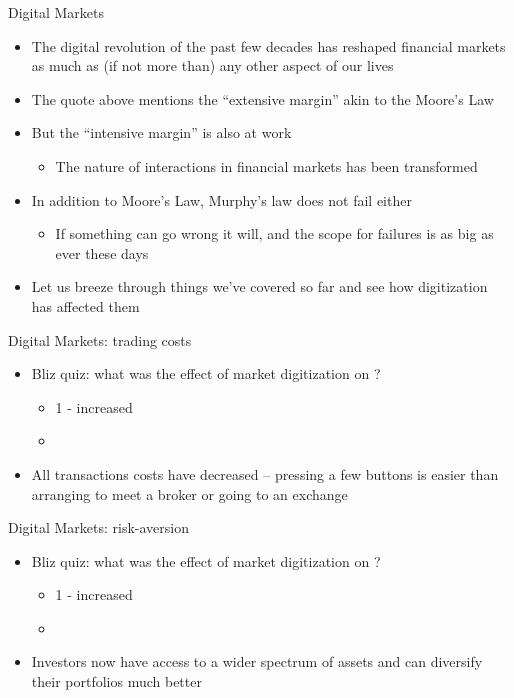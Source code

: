\documentclass[english,10pt
,aspectratio=169
]{beamer}
\begin{document}
\begin{frame}{Digital Markets}
	\begin{itemize}
		\item The digital revolution of the past few decades has reshaped financial markets as much as (if not more than) any other aspect of our lives
		\item The quote above mentions the ``extensive margin'' akin to the Moore's Law
		\item But the ``intensive margin'' is also at work
		\begin{itemize}
			\item The nature of interactions in financial markets has been transformed
		\end{itemize}
		\item In addition to Moore's Law, Murphy's law does not fail either
		\begin{itemize}
			\item If something can go wrong it will, and the scope for failures is as big as ever these days
		\end{itemize}
		\item Let us breeze through things we've covered so far and see how digitization has affected them
	\end{itemize}
\end{frame}


\begin{frame}{Digital Markets: trading costs}
	\begin{itemize}
		\item \alert{Bliz quiz}: what was the effect of market digitization on ?
		\begin{itemize}
			\item {1 - increased}
			\item {}
		\end{itemize}
		\pause
		\item All transactions costs have decreased -- pressing a few buttons is easier than arranging to meet a broker or going to an exchange
	\end{itemize}
\end{frame}


\begin{frame}{Digital Markets: risk-aversion}
	\begin{itemize}
		\item \alert{Bliz quiz}: what was the effect of market digitization on ?
		\begin{itemize}
			\item {1 - increased}
			\item {}
		\end{itemize}
		\pause
		\item Investors now have access to a wider spectrum of assets and can diversify their portfolios much better
	\end{itemize}
\end{frame}
\end{document}
